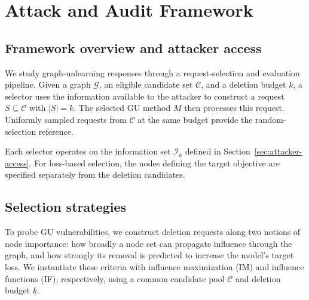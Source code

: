 \section{Attack and Audit Framework}
\label{sec:methods}




\subsection{Framework overview and attacker access}
We study graph-unlearning responses through a request-selection and evaluation pipeline. Given a graph $\mathcal G$, an eligible candidate set $\mathcal C$, and a deletion budget $k$, a selector uses the information available to the attacker to construct a request $S\subseteq\mathcal C$ with $|S|=k$. The selected GU method $M$ then processes this request. Uniformly sampled requests from $\mathcal C$ at the same budget provide the random-selection reference.

Each selector operates on the information set $\mathcal I_a$ defined in Section~\ref{sec:attacker-access}. For loss-based selection, the nodes defining the target objective are specified separately from the deletion candidates.



\subsection{Selection strategies}
\label{sec:selection}
To probe GU vulnerabilities, we construct deletion requests along two notions of node importance: how broadly a node set can propagate influence through the graph, and how strongly its removal is predicted to increase the model's target loss. We instantiate these criteria with influence maximization (IM) and influence functions (IF), respectively, using a common candidate pool $\mathcal C$ and deletion budget $k$.

